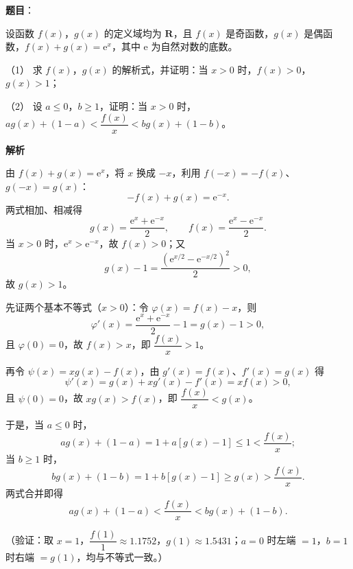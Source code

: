 \begin{answer}

\textbf{题目}：

设函数 \(f(x)\)，\(g(x)\) 的定义域均为 \(\mathbf{R}\)，且 \(f(x)\) 是奇函数，\(g(x)\) 是偶函数，\(f(x)+g(x)=\mathrm{e}^x\)，其中 \(\mathrm{e}\) 为自然对数的底数。

（1） 求 \(f(x)\)，\(g(x)\) 的解析式，并证明：当 \(x>0\) 时，\(f(x)>0\)，\(g(x)>1\)；

（2） 设 \(a\leqslant0\)，\(b\geqslant1\)，证明：当 \(x>0\) 时，\(ag(x)+(1-a)<\dfrac{f(x)}{x}<bg(x)+(1-b)\)。

\textbf{解析}


由 \(f(x)+g(x)=\mathrm{e}^x\)，将 \(x\) 换成 \(-x\)，利用 \(f(-x)=-f(x)\)、\(g(-x)=g(x)\)：
\nopagebreak[4]
\[
-f(x)+g(x)=\mathrm{e}^{-x}.
\]
两式相加、相减得
\nopagebreak[4]
\[
g(x)=\frac{\mathrm{e}^x+\mathrm{e}^{-x}}{2},\qquad
f(x)=\frac{\mathrm{e}^x-\mathrm{e}^{-x}}{2}.
\]
当 \(x>0\) 时，\(\mathrm{e}^x>\mathrm{e}^{-x}\)，故 \(f(x)>0\)；又
\nopagebreak[4]
\[
g(x)-1=\frac{\left(\mathrm{e}^{x/2}-\mathrm{e}^{-x/2}\right)^2}{2}>0,
\]
故 \(g(x)>1\)。


先证两个基本不等式（\(x>0\)）：令 \(\varphi(x)=f(x)-x\)，则
\nopagebreak[4]
\[
\varphi'(x)=\frac{\mathrm{e}^x+\mathrm{e}^{-x}}{2}-1=g(x)-1>0,
\]
且 \(\varphi(0)=0\)，故 \(f(x)>x\)，即 \(\dfrac{f(x)}{x}>1\)。

再令 \(\psi(x)=xg(x)-f(x)\)，由 \(g'(x)=f(x)\)、\(f'(x)=g(x)\) 得
\nopagebreak[4]
\[
\psi'(x)=g(x)+xg'(x)-f'(x)=xf(x)>0,
\]
且 \(\psi(0)=0\)，故 \(xg(x)>f(x)\)，即 \(\dfrac{f(x)}{x}<g(x)\)。

于是，当 \(a\leqslant0\) 时，
\nopagebreak[4]
\[
ag(x)+(1-a)=1+a\left[g(x)-1\right]\leqslant1<\frac{f(x)}{x};
\]
当 \(b\geqslant1\) 时，
\nopagebreak[4]
\[
bg(x)+(1-b)=1+b\left[g(x)-1\right]\geqslant g(x)>\frac{f(x)}{x}.
\]
两式合并即得
\nopagebreak[4]
\[
ag(x)+(1-a)<\frac{f(x)}{x}<bg(x)+(1-b).
\]

（验证：取 \(x=1\)，\(\dfrac{f(1)}{1}\approx1.1752\)，\(g(1)\approx1.5431\)；\(a=0\) 时左端 \(=1\)，\(b=1\) 时右端 \(=g(1)\)，均与不等式一致。）



\end{answer}
